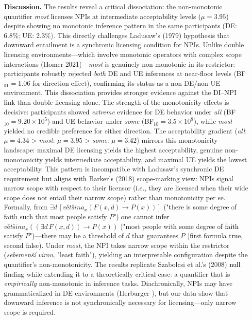 \documentclass[12pt, a4]{article}
\begin{document}
\noindent \textbf{Discussion.} The results reveal a critical dissociation: the non-monotonic quantifier \textit{most} licenses NPIs at intermediate acceptability levels ($\mu=3.95$) despite showing no monotonic inference pattern in the same participants (DE: 6.8\%; UE: 2.3\%). This directly challenges Ladusaw's (1979) hypothesis that downward entailment is a synchronic licensing condition for NPIs. Unlike double licensing environments—which involve monotonic operators with complex scope interactions (Homer 2021)—\textit{most} is genuinely non-monotonic in its restrictor: participants robustly rejected \textit{both} DE and UE inferences at near-floor levels (BF$_{01}=1.06$ for direction effect), confirming its status as a non-DE/non-UE environment. This dissociation provides stronger evidence against the DI--NPI link than double licensing alone. The strength of the monotonicity effects is decisive: participants showed \textit{extreme} evidence for DE behavior under \textit{all} (BF$_{10}=9.20\times10^{5}$) and UE behavior under \textit{some} (BF$_{10}=3.5\times10^{8}$), while \textit{most} yielded no credible preference for either direction. The acceptability gradient (\textit{all}: $\mu=4.34$ > \textit{most}: $\mu=3.95$ > \textit{some}: $\mu=3.42$) mirrors this monotonicity landscape: maximal DE licensing yields the highest acceptability, genuine non-monotonicity yields intermediate acceptability, and maximal UE yields the lowest acceptability. This pattern is incompatible with Ladusaw's synchronic DE requirement but aligns with Barker's (2018) scope-marking view: NPIs signal narrow scope with respect to their licensor (i.e., they are licensed when their wide scope does not entail their narrow scope) rather than monotonicity per se. Formally, from $\exists d\,[\textit{v\v{e}t\v{s}ina}_x(F(x,d)\rightarrow P(x))]$ ("there is some degree of faith such that most people satisfy $P$") one cannot infer $\textit{v\v{e}t\v{s}ina}_x((\exists d\,F(x,d))\rightarrow P(x))$ ("most people with some degree of faith satisfy $P$")—there may be a threshold of $d$ that guarantees $P$ (first formula true, second false). Under \textit{most}, the NPI takes narrow scope within the restrictor (\textit{sebemen\v{s}\'{i} v\'{i}rou}, "least faith"), yielding an interpretable configuration despite the quantifier's non-monotonicity. The results replicate Szabolcsi et al.'s (2008) null finding while extending it to a theoretically critical case: a quantifier that is \textit{empirically} non-monotonic in inference tasks. Diachronically, NPIs may have grammaticalized in DE environments (Herburger \citeyear{Herburger-2023}), but our data show that downward inference is not synchronically necessary for licensing—only narrow scope is required.
\end{document}
